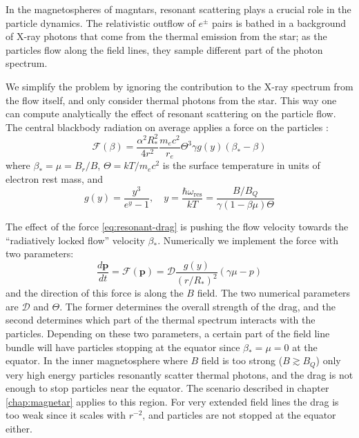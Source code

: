 In the magnetospheres of magntars, resonant scattering plays a crucial role in
the particle dynamics. The relativistic outflow of $e^{\pm}$ pairs is bathed in
a background of X-ray photons that come from the thermal emission from the star;
as the particles flow along the field lines, they sample different part of the
photon spectrum.

We simplify the problem by ignoring the contribution to the X-ray spectrum from
the flow itself, and only consider thermal photons from the star. This way one
can compute analytically the effect of resonant scattering on the particle flow.
The central blackbody radiation on average applies a force on the particles
\citep{beloborodov_electron-positron_2012}:
\begin{equation}
  \label{eq:resonant-drag}
  \mathcal{F}(\beta) = \frac{\alpha^2R_{*}^2}{4r^2}\frac{m_{e}c^2}{r_{e}}\Theta^3\gamma g(y)(\beta_{*}-\beta)
\end{equation}
where $\beta_{*} = \mu = B_r/B$, $\Theta = kT/m_{e}c^2$ is the surface
temperature in units of electron rest mass, and
\begin{equation}
  \label{eq:y-and-gy}
  g(y) = \frac{y^3}{e^y - 1},\quad y = \frac{\hbar\omega_\mathrm{res}}{kT} = \frac{B/B_Q}{\gamma(1 - \beta\mu)\Theta}
\end{equation}

The effect of the force \eqref{eq:resonant-drag} is pushing the flow velocity
towards the ``radiatively locked flow'' velocity $\beta_{*}$. Numerically we
implement the force with two parameters:
\begin{equation}
  \label{eq:resonant-drag-numerical}
  \frac{d\mathbf{p}}{dt} = \mathcal{F}(\mathbf{p}) = \mathcal{D}\frac{g(y)}{(r/R_{*})^2}(\gamma\mu - p)
\end{equation}
and the direction of this force is along the $B$ field. The two numerical
parameters are $\mathcal{D}$ and $\Theta$. The former determines the overall
strength of the drag, and the second determines which part of the thermal
spectrum interacts with the particles. Depending on these two parameters, a
certain part of the field line bundle will have particles stopping at the
equator since $\beta_{*} = \mu = 0$ at the equator. In the inner magnetosphere
where $B$ field is too strong ($B \gtrsim B_{Q}$) only very high energy
particles resonantly scatter thermal photons, and the drag is not enough to stop
particles near the equator. The scenario described in chapter
\ref{chap:magnetar} applies to this region. For very extended field lines the
drag is too weak since it scales with $r^{-2}$, and particles are not stopped at
the equator either.

